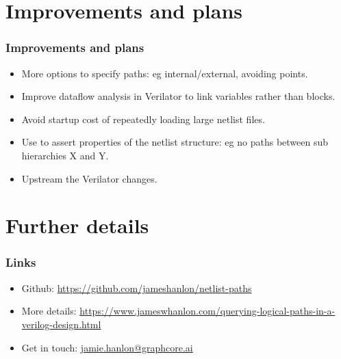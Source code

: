 \documentclass[professionalfonts]{beamer}
\begin{document}
\section{Improvements and plans}
\begin{frame}
\frametitle{Improvements and plans}
  \begin{itemize}
  \item More options to specify paths: eg internal/external, avoiding points.
  \item Improve dataflow analysis in Verilator to link variables rather than
    blocks.
  \item Avoid startup cost of repeatedly loading large netlist files.
  \item Use to assert properties of the netlist structure: eg no paths between
    sub hierarchies X and Y.
  \item Upstream the Verilator changes.
  \end{itemize}
\end{frame}

\section{Further details}
\begin{frame}
\frametitle{Links}
  \begin{itemize}
  \item Github:
    \url{https://github.com/jameshanlon/netlist-paths}
  \item More details:
    \url{https://www.jameswhanlon.com/querying-logical-paths-in-a-verilog-design.html}
  \item Get in touch:
    \url{jamie.hanlon@graphcore.ai}
  \end{itemize}
\end{frame}
\end{document}

